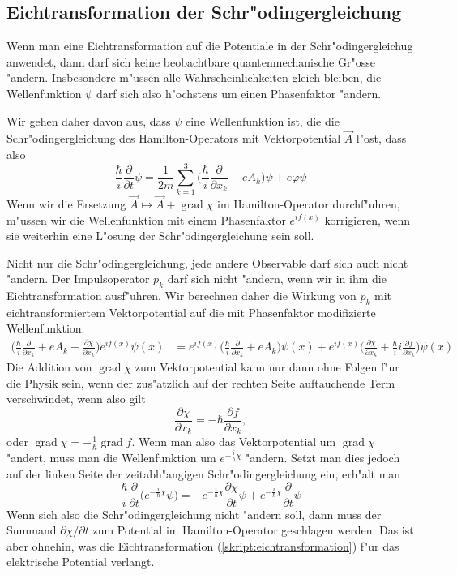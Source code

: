\subsection{Eichtransformation der Schr"odingergleichung}
Wenn man eine Eichtransformation auf die Potentiale in der
Schr"odingergleichug anwendet, dann darf sich keine beobachtbare
quantenmechanische Gr"osse "andern. Insbesondere m"ussen alle
Wahrscheinlichkeiten gleich bleiben, die Wellenfunktion
$\psi$ darf sich also h"ochstens um einen Phasenfaktor "andern.

Wir gehen daher davon aus, dass $\psi$ eine Wellenfunktion ist,
die die Schr"odingergleichung des Hamilton-Operators mit Vektorpotential
$\vec A$ l"ost, dass also
\[
\frac{\hbar}{i}\frac{\partial}{\partial t}\psi
=
\frac1{2m}\sum_{k=1}^3\biggl(\frac{\hbar}{i}\frac{\partial}{\partial x_k}-eA_k\biggr)\psi
+e\varphi\psi
\]
Wenn wir die Ersetzung
$\vec A\mapsto \vec A+\operatorname{grad}\chi$
im Hamilton-Operator durchf"uhren, m"ussen wir die Wellenfunktion
mit einem Phasenfaktor $e^{if(x)}$ korrigieren, wenn sie weiterhin
eine L"osung der Schr"odingergleichung sein soll.

Nicht nur die Schr"odingergleichung, jede andere Observable darf sich
auch nicht "andern.
Der Impulsoperator $p_k$ darf sich nicht "andern, wenn wir in ihm die
Eichtransformation ausf"uhren.
Wir berechnen daher die Wirkung von $p_k$ mit eichtransformiertem
Vektorpotential auf die mit Phasenfaktor modifizierte Wellenfunktion:
\begin{align*}
\biggl(
\frac{\hbar}{i}\frac{\partial}{\partial x_k}+eA_k
+\frac{\partial\chi}{\partial x_k}
\biggr)e^{if(x)}\psi(x)
&=
e^{if(x)}
\biggl(
\frac{\hbar}{i}\frac{\partial}{\partial x_k}+eA_k
\biggr)\psi(x)
+
e^{if(x)}
\biggl(
\frac{\partial\chi}{\partial x_k}
+
\frac{\hbar}{i}i\frac{\partial f}{\partial x_k}
\biggr)
\psi(x)
\end{align*}
Die Addition von $\operatorname{grad}\chi$ zum Vektorpotential
kann nur dann ohne Folgen f"ur die Physik sein, wenn der
zus"atzlich auf der rechten Seite auftauchende Term verschwindet,
wenn also gilt
\[
\frac{\partial\chi}{\partial x_k}=-\hbar\frac{\partial f}{\partial x_k},
\]
oder $\operatorname{grad}\chi=-\frac1{\hbar}\operatorname{grad}f$.
Wenn man also das Vektorpotential um $\operatorname{grad}\chi$ "andert,
muss man die Wellenfunktion um $e^{-\frac{i}{\hbar}\chi}$ "andern. 
Setzt man dies jedoch auf der linken Seite der zeitabh"angigen
Schr"odingergleichung ein, erh"alt man
\[
\frac{\hbar}{i}\frac{\partial}{\partial t}
\bigl(
e^{-\frac{i}{\hbar}\chi}
\psi
\bigr)
=
-
e^{-\frac{i}{\hbar}\chi}
\frac{\partial\chi}{\partial t}
\psi
+
e^{-\frac{i}{\hbar}\chi}
\frac{\partial}{\partial t}
\psi
\]
Wenn sich also die Schr"odingergleichung nicht "andern soll, dann
muss der Summand $\partial\chi/\partial t$ zum Potential im
Hamilton-Operator geschlagen werden.
Das ist aber ohnehin, was die Eichtransformation (\ref{skript:eichtransformation})
f"ur das elektrische Potential verlangt.

